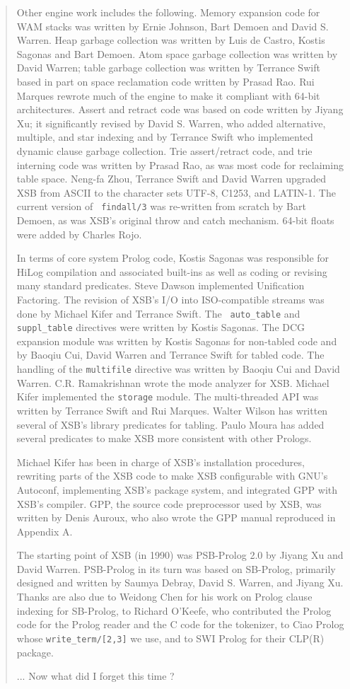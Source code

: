 \begin{quote}
Other engine work includes the following.  Memory expansion code for
WAM stacks was written by Ernie Johnson, Bart Demoen and David
S. Warren.  Heap garbage collection was written by Luis de Castro,
Kostis Sagonas and Bart Demoen.  Atom space garbage collection was
written by David Warren; table garbage collection was written by
Terrance Swift based in part on space reclamation code written by
Prasad Rao.  Rui Marques rewrote much of the engine to make it
compliant with 64-bit architectures.  Assert and retract code was
based on code written by Jiyang Xu; it significantly revised by David
S. Warren, who added alternative, multiple, and star indexing and by
Terrance Swift who implemented dynamic clause garbage collection. Trie
assert/retract code, and trie interning code was written by Prasad
Rao, as was most code for reclaiming table space. Neng-fa Zhou,
Terrance Swift and David Warren upgraded XSB from ASCII to the
character sets UTF-8, C1253, and LATIN-1.  The current version of {\tt
  findall/3} was re-written from scratch by Bart Demoen, as was XSB's
original throw and catch mechanism.  64-bit floats were added by
Charles Rojo.  

In terms of core system Prolog code, Kostis Sagonas was responsible
for HiLog compilation and associated built-ins as well as coding or
revising many standard predicates.  Steve Dawson implemented
Unification Factoring.  The revision of XSB's I/O into ISO-compatible
streams was done by Michael Kifer and Terrance Swift.  The {\tt
  auto\_table} and {\tt suppl\_table} directives were written by
Kostis Sagonas.  The DCG expansion module was written by Kostis
Sagonas for non-tabled code and by Baoqiu Cui, David Warren and
Terrance Swift for tabled code.  The handling of the {\tt multifile}
directive was written by Baoqiu Cui and David
Warren. C.R. Ramakrishnan wrote the mode analyzer for XSB.  Michael
Kifer implemented the {\tt storage} module.  The multi-threaded API
was written by Terrance Swift and Rui Marques.  Walter Wilson has
written several of XSB's library predicates for tabling.  Paulo Moura
has added several predicates to make XSB more consistent with other
Prologs.  

Michael Kifer has been in charge of XSB's installation procedures,
rewriting parts of the XSB code to make XSB configurable with GNU's
Autoconf, implementing XSB's package system, and integrated GPP with
XSB's compiler.  GPP, the source code preprocessor used by XSB, was
written by Denis Auroux, who also wrote the GPP manual reproduced in
Appendix A.

The starting point of XSB (in 1990) was PSB-Prolog 2.0 by Jiyang Xu
and David Warren.  PSB-Prolog in its turn was based on SB-Prolog,
primarily designed and written by Saumya Debray, David S. Warren, and
Jiyang Xu.  Thanks are also due to Weidong Chen for his work on Prolog
clause indexing for SB-Prolog, to Richard O'Keefe, who contributed the
Prolog code for the Prolog reader and the C code for the tokenizer, to
Ciao Prolog whose {\tt write\_term/[2,3]} we use, and to SWI Prolog
for their CLP(R) package.

... Now what did I forget this time ?

\end{quote}

